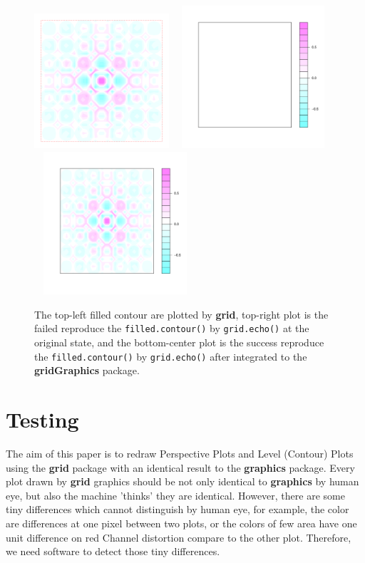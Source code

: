 \documentclass[paper=a4, fontsize=11pt]{report}
\begin{document}
\begin{figure}[h]
	\begin{center}
		\includegraphics[height = 5cm, width = 5cm]{figure/filledContour_origin_02.pdf}
		\includegraphics[height = 5.3cm, width = 6cm]{figure/filledContour_origin_03.pdf}
		\includegraphics[height = 5.3cm, width = 6cm]{figure/filledContour_origin_01.pdf}
		
		\caption{The top-left filled contour are plotted by \textbf{grid}, top-right plot is the failed reproduce the \texttt{filled.contour()} by \texttt{grid.echo()} at the original state, and the bottom-center plot is the success reproduce the \texttt{filled.contour()} by \texttt{grid.echo()} after integrated to the \textbf{gridGraphics} package.}
		\label{figure_4.6}
	\end{center}
\end{figure}


\chapter{Testing}
The aim of this paper is to redraw Perspective Plots and Level (Contour) Plots using the \textbf{grid} package with an identical result to the \textbf{graphics} package. Every plot drawn by \textbf{grid} graphics should be not only identical to \textbf{graphics} by human eye, but also the machine 'thinks' they are identical. However, there are some tiny differences which cannot distinguish by human eye, for example, the color are differences at one pixel between two plots, or the colors of few area have one unit difference on red Channel distortion compare to the other plot. Therefore, we need software to detect those tiny differences.\\
\end{document}
